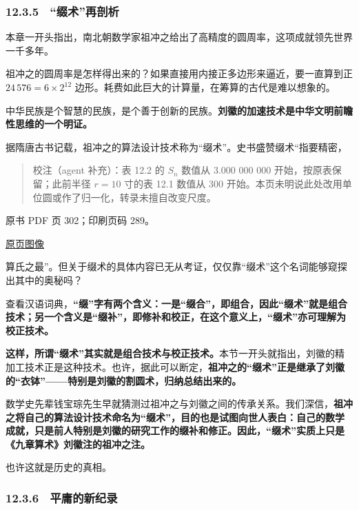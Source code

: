 \subsubsection{12.3.5　``缀术''再剖析}\label{ch12-ux7f00ux672fux518dux5256ux6790}

本章一开头指出，南北朝数学家祖冲之给出了高精度的圆周率，这项成就领先世界一千多年。

祖冲之的圆周率是怎样得出来的？如果直接用内接正多边形来逼近，要一直算到正 \(24\,576=6\times2^{12}\) 边形。耗费如此巨大的计算量，在筹算的古代是难以想象的。

中华民族是个智慧的民族，是个善于创新的民族。\textbf{刘徽的加速技术是中华文明前瞻性思维的一个明证。}

据隋唐古书记载，祖冲之的算法设计技术称为``缀术''。史书盛赞缀术``指要精密，

\begin{quote}
校注（agent 补充）：表 12.2 的 \(S_n\) 数值从 3.000 000 000 开始，按原表保留；此前半径 \(r=10\) 寸的表 12.1 数值从 300 开始。本页未明说此处改用单位圆或作了归一化，转录未擅自改变尺度。
\end{quote}

\clearpage

原书 PDF 页 302；印刷页码 289。

\href{source-images/pdf-302.jpeg}{原页图像}

算氏之最''。但关于缀术的具体内容已无从考证，仅仅靠``缀术''这个名词能够窥探出其中的奥秘吗？

查看汉语词典，\textbf{``缀''字有两个含义：一是``缀合''，即组合，因此``缀术''就是组合技术；另一个含义是``缀补''，即修补和校正，在这个意义上，``缀术''亦可理解为校正技术。}

\textbf{这样，所谓``缀术''其实就是组合技术与校正技术。}本节一开头就指出，刘徽的精加工技术正是这种技术。也许，据此可以断定，\textbf{祖冲之的``缀术''正是继承了刘徽的``衣钵''------特别是刘徽的割圆术，归纳总结出来的。}

数学史先辈钱宝琮先生早就猜测过祖冲之与刘徽之间的传承关系。我们深信，\textbf{祖冲之将自己的算法设计技术命名为``缀术''，目的也是试图向世人表白：自己的数学成就，只是前人特别是刘徽的研究工作的缀补和修正。因此，``缀术''实质上只是《九章算术》刘徽注的祖冲之注。}

也许这就是历史的真相。

\subsubsection{12.3.6　平庸的新纪录}\label{ch12-ux5e73ux5eb8ux7684ux65b0ux7eaaux5f55}

